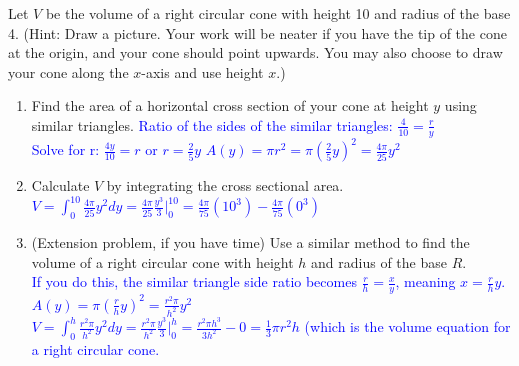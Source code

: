 \documentclass{ximera}
\begin{document}
\begin{exercise}
    Let $V$ be the volume of a right circular cone with height 10 and radius of the base 4.  (Hint: Draw a picture.  Your work will be neater if you have the tip of the cone at the origin, and your cone should point upwards.  You may also choose to draw your cone along the $x$-axis and use height $x$.)
    \begin{center}
    \end{center}
    \begin{enumerate}
        \item Find the area of a horizontal cross section of your cone at height $y$ using similar triangles.
        \textcolor{blue}{Ratio of the sides of the similar triangles: $\frac4{10}=\frac{r}{y}$ \\
        Solve for r: $\frac{4y}{10}=r$ or $r=\frac{2}{5}y$
        $A(y)=\pi r^2=\pi(\frac{2}{5}y)^2=\frac{4\pi}{25}y^2$}

        \item Calculate $V$ by integrating the cross sectional area. \\
        \textcolor{blue}{ $V=\displaystyle \int_0^{10} \frac{4\pi}{25}y^2dy=\frac{4\pi}{25}\frac{y^3}{3}\bigg|_0^{10}=\frac{4\pi}{75}(10^3)-\frac{4\pi}{75}(0^3)$}

        \item (Extension problem, if you have time) Use a similar method to find the volume of a right circular cone with height $h$ and radius of the base $R$.\\
        \textcolor{blue}{ If you do this, the similar triangle side ratio becomes $\frac{r}{h}=\frac{x}{y}$, meaning $x=\frac{r}{h}y$.\\
        $A(y)=\pi(\frac{r}{h}y)^2=\frac{r^2\pi}{h^2}y^2$\\
        $\displaystyle V=\int_0^h \frac{r^2\pi}{h^2}y^2dy=\frac{r^2\pi}{h^2}\frac{y^3}{3}\bigg|_0^h= \frac{r^2\pi h^3}{3h^2}-0=\frac13\pi r^2h $ (which is the volume equation for a right circular cone.}
    \end{enumerate}
\end{exercise}
\end{document}
